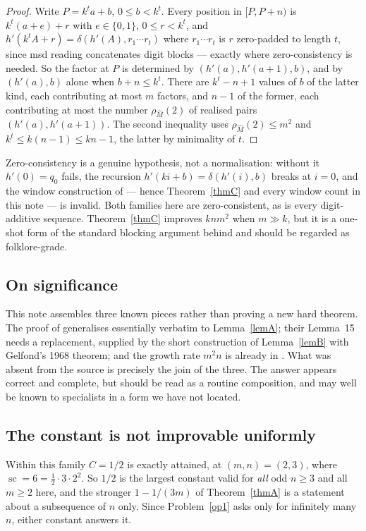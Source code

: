 \documentclass[10pt,reqno]{amsart}
\theoremstyle{plain}
\theoremstyle{definition}
\theoremstyle{remark}
\numberwithin{theorem}{section}
\DeclareMathOperator{\sco}{sc}
\begin{document}
\begin{proof}
Write $P = k^t a + b$, $0 \le b < k^t$. Every position in $[P, P+n)$ is $k^t(a+e) + r$ with
$e \in \{0,1\}$, $0 \le r < k^t$, and $h'(k^t A + r) = \delta(h'(A), r_1 \cdots r_t)$ where
$r_1\cdots r_t$ is $r$ zero-padded to length $t$, since msd reading concatenates digit
blocks --- exactly where zero-consistency is needed. So the factor at $P$ is determined by
$(h'(a), h'(a+1), b)$, and by $(h'(a), b)$ alone when $b + n \le k^t$. There are
$k^t - n + 1$ values of $b$ of the latter kind, each contributing at most $m$ factors, and
$n-1$ of the former, each contributing at most the number $\rho_{\widehat M}(2)$ of realised
pairs $(h'(a),h'(a+1))$. The second inequality uses $\rho_{\widehat M}(2) \le m^2$ and
$k^t \le k(n-1) \le kn-1$, the latter by minimality of $t$.
\end{proof}

Zero-consistency is a genuine hypothesis, not a normalisation: without it $h'(0) = q_0$
fails, the recursion $h'(ki+b) = \delta(h'(i),b)$ breaks at $i = 0$, and the window
construction of \cite[Thm.~9]{MRS} --- hence Theorem~\ref{thmC} and every window count in
this note --- is invalid. Both families here are zero-consistent, as is every
digit-additive sequence. Theorem~\ref{thmC} improves $knm^2$ when $m \gg k$, but it is a
one-shot form of the standard blocking argument behind \cite[Thm.~10.3.1]{AS} and should be
regarded as folklore-grade.

\subsection*{On significance}
This note assembles three known pieces rather than proving a new hard theorem. The proof of
\cite[Thm.~16]{MRS} generalises essentially verbatim to Lemma~\ref{lemA}; their Lemma~15
needs a replacement, supplied by the short construction of Lemma~\ref{lemB} with Gelfond's
1968 theorem; and the growth rate $m^2n$ is already in \cite{TrompShallit, Starosta}. What
was absent from the source is precisely the join of the three. The answer appears correct
and complete, but should be read as a routine composition, and may well be known to
specialists in a form we have not located.

\subsection*{The constant is not improvable uniformly}
Within this family $C = 1/2$ is exactly attained, at $(m,n) = (2,3)$, where
$\sco = 6 = \tfrac12 \cdot 3 \cdot 2^2$. So $1/2$ is the largest constant valid for
\emph{all} odd $n \ge 3$ and all $m \ge 2$ here, and the stronger $1 - 1/(3m)$ of
Theorem~\ref{thmA} is a statement about a subsequence of $n$ only. Since Problem~\ref{op1}
asks only for infinitely many $n$, either constant answers it.
\end{document}

